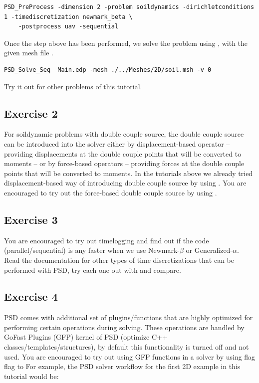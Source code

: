 \begin{lstlisting}[style=BashInputStyle]
	PSD_PreProcess -dimension 2 -problem soildynamics -dirichletconditions 1 -timediscretization newmark_beta \
	-postprocess uav -sequential
\end{lstlisting}

Once the step above has been performed, we solve the problem using , with the given mesh file . 

\begin{lstlisting}[style=BashInputStyle]
	PSD_Solve_Seq  Main.edp -mesh ./../Meshes/2D/soil.msh -v 0
\end{lstlisting}

Try it out for other problems of this tutorial. 

\subsection{Exercise 2}

For soildynamic problems with double couple source, the double couple source can be introduced into the solver either by displacement-based operator -- providing displacements at the double couple points that will be converted to moments -- or by force-based operators -- providing forces at the double couple points that  will be converted to moments. In the tutorials above we already tried displacement-based way of introducing double couple source by using . You are encouraged to try out the force-based double couple source by using .

\subsection{Exercise 3}

You are encouraged to try out timelogging and find out if the code (parallel/sequential) is any faster when we use Newmark-$\beta$ or Generalized-$\alpha$. Read the documentation for other types of time discretizations that can be performed with PSD, try each one out with  and compare.

\subsection{Exercise  4}

PSD comes with additional set of plugins/functions that are highly optimized for performing certain operations during solving. These operations are handled by GoFast Plugins (GFP) kernel of PSD (optimize C++ classes/templates/structures), by default this functionality is turned off and not used. You are encouraged to try out using GFP functions in a solver by using  flag flag to  For example, the PSD solver workflow for the first 2D example in this tutorial would be:

